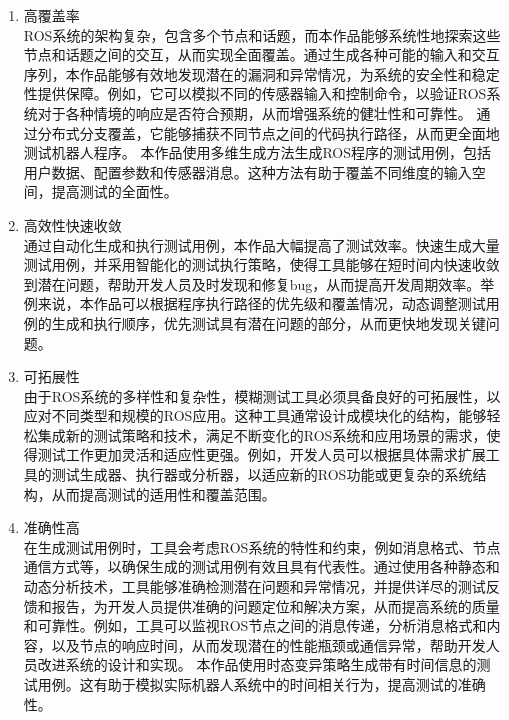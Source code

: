 \begin{enumerate}
	\item 高覆盖率 \\
	ROS系统的架构复杂，包含多个节点和话题，而本作品能够系统性地探索这些节点和话题之间的交互，从而实现全面覆盖。通过生成各种可能的输入和交互序列，本作品能够有效地发现潜在的漏洞和异常情况，为系统的安全性和稳定性提供保障。例如，它可以模拟不同的传感器输入和控制命令，以验证ROS系统对于各种情境的响应是否符合预期，从而增强系统的健壮性和可靠性。
	通过分布式分支覆盖，它能够捕获不同节点之间的代码执行路径，从而更全面地测试机器人程序。
	本作品使用多维生成方法生成ROS程序的测试用例，包括用户数据、配置参数和传感器消息。这种方法有助于覆盖不同维度的输入空间，提高测试的全面性。
	\item 高效性快速收敛 \\
	通过自动化生成和执行测试用例，本作品大幅提高了测试效率。快速生成大量测试用例，并采用智能化的测试执行策略，使得工具能够在短时间内快速收敛到潜在问题，帮助开发人员及时发现和修复bug，从而提高开发周期效率。举例来说，本作品可以根据程序执行路径的优先级和覆盖情况，动态调整测试用例的生成和执行顺序，优先测试具有潜在问题的部分，从而更快地发现关键问题。
	\item 可拓展性 \\
	由于ROS系统的多样性和复杂性，模糊测试工具必须具备良好的可拓展性，以应对不同类型和规模的ROS应用。这种工具通常设计成模块化的结构，能够轻松集成新的测试策略和技术，满足不断变化的ROS系统和应用场景的需求，使得测试工作更加灵活和适应性更强。例如，开发人员可以根据具体需求扩展工具的测试生成器、执行器或分析器，以适应新的ROS功能或更复杂的系统结构，从而提高测试的适用性和覆盖范围。
	\item 准确性高 \\
	在生成测试用例时，工具会考虑ROS系统的特性和约束，例如消息格式、节点通信方式等，以确保生成的测试用例有效且具有代表性。通过使用各种静态和动态分析技术，工具能够准确检测潜在问题和异常情况，并提供详尽的测试反馈和报告，为开发人员提供准确的问题定位和解决方案，从而提高系统的质量和可靠性。例如，工具可以监视ROS节点之间的消息传递，分析消息格式和内容，以及节点的响应时间，从而发现潜在的性能瓶颈或通信异常，帮助开发人员改进系统的设计和实现。
	本作品使用时态变异策略生成带有时间信息的测试用例。这有助于模拟实际机器人系统中的时间相关行为，提高测试的准确性。
\end{enumerate}